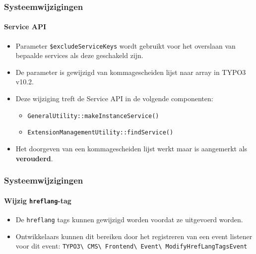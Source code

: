 
\begin{frame}[fragile]
	\frametitle{Systeemwijzigingen}
	\framesubtitle{Service API}

	\begin{itemize}
		\item Parameter \texttt{\$excludeServiceKeys} wordt gebruikt voor het overslaan van bepaalde services
			als deze geschakeld zijn.
		\item De parameter is gewijzigd van kommagescheiden lijst naar array in TYPO3 v10.2.
		\item Deze wijziging treft de Service API in de volgende componenten:

			\begin{itemize}
				\item \texttt{GeneralUtility::makeInstanceService()}
				\item \texttt{ExtensionManagementUtility::findService()}
			\end{itemize}

		\item Het doorgeven van een kommagescheiden lijst werkt maar is aangemerkt als \textbf{verouderd}.

	\end{itemize}

\end{frame}


\begin{frame}[fragile]
	\frametitle{Systeemwijzigingen}
	\framesubtitle{Wijzig \texttt{hreflang}-tag}

	\lstset{basicstyle=\smaller\ttfamily}

	\begin{itemize}
		\item De \texttt{hreflang} tags kunnen gewijzigd worden voordat ze uitgevoerd worden.
		\item Ontwikkelaars kunnen dit bereiken door het registreren van een event listener voor dit event:\newline
			\smaller
				\texttt{TYPO3\textbackslash
					CMS\textbackslash
					Frontend\textbackslash
					Event\textbackslash
					ModifyHrefLangTagsEvent}
			\normalsize
	\end{itemize}

\end{frame}

